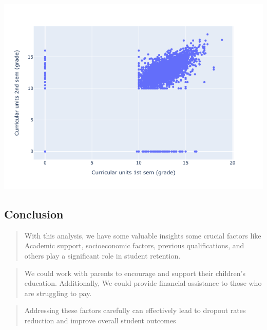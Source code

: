 \documentclass[
  letterpaper,
  DIV=11,
  numbers=noendperiod]{scrartcl}
\begin{document}
\includegraphics{report_AzadhdhinNedalYunisAlFraijat_files/figure-pdf/cell-36-output-1.png}

\hypertarget{conclusion}{%
\subsection{\texorpdfstring{\textbf{Conclusion}}{Conclusion}}\label{conclusion}}

\begin{quote}
With this analysis, we have some valuable insights some crucial factors
like Academic support, socioeconomic factors, previous qualifications,
and others play a significant role in student retention.
\end{quote}

\begin{quote}
We could work with parents to encourage and support their children's
education. Additionally, We could provide financial assistance to those
who are struggling to pay.
\end{quote}

\begin{quote}
Addressing these factors carefully can effectively lead to dropout rates
reduction and improve overall student outcomes
\end{quote}


\printbibliography
\end{document}
